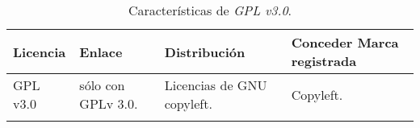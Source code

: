\begin{longtable}[]{@{}llll@{}} 
\toprule 
\begin{minipage}[b]{0.11\columnwidth}\raggedright\strut
Licencia\strut
\end{minipage} & \begin{minipage}[b]{0.15\columnwidth}\raggedright\strut
Enlace\strut
\end{minipage} & \begin{minipage}[b]{0.20\columnwidth}\raggedright\strut
Distribución\strut
\end{minipage} & \begin{minipage}[b]{0.40\columnwidth}\raggedright\strut
Conceder Marca registrada\strut
\end{minipage}\tabularnewline
\midrule
\endhead
\begin{minipage}[t]{0.15\columnwidth}\raggedright\strut
GPL v3.0\strut
\end{minipage} & \begin{minipage}[t]{0.15\columnwidth}\raggedright\strut
sólo con GPLv 3.0.\strut
\end{minipage} & \begin{minipage}[t]{0.20\columnwidth}\raggedright\strut
Licencias de GNU copyleft.\strut
\end{minipage} & \begin{minipage}[t]{0.40\columnwidth}\raggedright\strut
Copyleft.\strut
\end{minipage}\tabularnewline
\bottomrule
\caption{Características de \textit{GPL v3.0}.}
\label{gnuresumetable}
\end{longtable}


